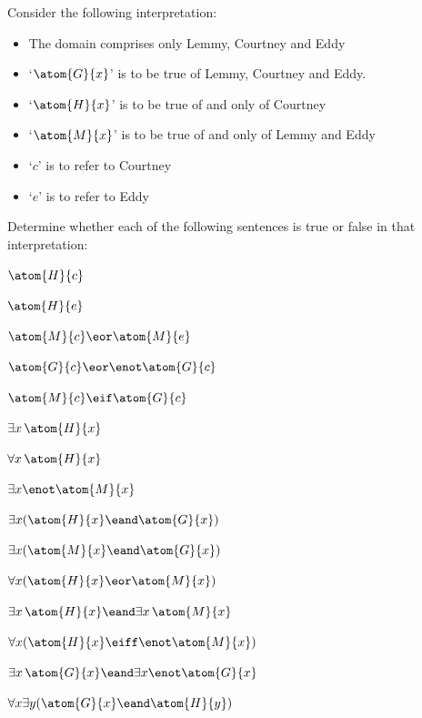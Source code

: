 \problempart
\label{pr.TorF2}
Consider the following interpretation:	
	\begin{itemize}
		\item The domain comprises only Lemmy, Courtney and Eddy
		\item `$\atom{G}{x}$' is to be true of Lemmy, Courtney and Eddy.
		\item `$\atom{H}{x}$' is to be true of and only of Courtney
		\item `$\atom{M}{x}$' is to be true of and only of Lemmy and Eddy
		\item `$c$' is to refer to Courtney
		\item `$e$' is to refer to Eddy
	\end{itemize}
Determine whether each of the following sentences is true or false in that interpretation:
\begin{compactlist}
\item $\atom{H}{c}$ \hfill {}
\item $\atom{H}{e}$\hfill {}
\item $\atom{M}{c} \eor \atom{M}{e}$ \hfill {}
\item $\atom{G}{c} \eor \enot \atom{G}{c}$ \hfill {}
\item $\atom{M}{c} \eif \atom{G}{c}$ \hfill {}
\item $\exists x\,\atom{H}{x}$ \hfill {}
\item $\forall x\,\atom{H}{x}$ \hfill {}
\item $\exists x \enot \atom{M}{x}$ \hfill {}
\item $\exists x(\atom{H}{x} \eand \atom{G}{x})$ \hfill {}
\item $\exists x(\atom{M}{x} \eand \atom{G}{x})$ \hfill {}
\item $\forall x(\atom{H}{x} \eor \atom{M}{x})$ \hfill {}
\item $\exists x\,\atom{H}{x} \eand \exists x\,\atom{M}{x}$ \hfill {}
\item $\forall x(\atom{H}{x} \eiff \enot \atom{M}{x})$ \hfill {}
\item $\exists x\,\atom{G}{x} \eand \exists x \enot \atom{G}{x}$ \hfill {}
\item $\forall x\exists y(\atom{G}{x} \eand \atom{H}{y})$ \hfill {}
\end{compactlist}

